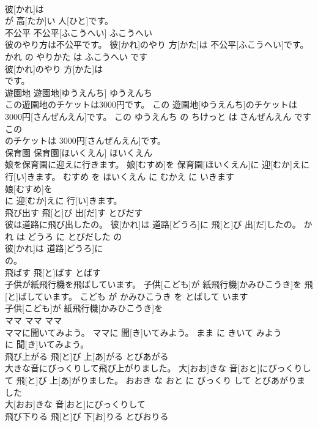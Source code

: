 \documentclass[8pt]{extreport}
\begin{document}
\begin{CJK}{UTF8}{min}
\\	彼[かれ]は
\\	が 高[たか]い 人[ひと]です。			
\\	不公平	不公平[ふこうへい]	ふこうへい	
\\	彼のやり方は不公平です。	彼[かれ]のやり 方[かた]は 不公平[ふこうへい]です。	かれ の やりかた は ふこうへい です	
\\	彼[かれ]のやり 方[かた]は
\\	です。			
\\	遊園地	遊園地[ゆうえんち]	ゆうえんち	
\\	この遊園地のチケットは3000円です。	この 遊園地[ゆうえんち]のチケットは 3000円[さんぜんえん]です。	この ゆうえんち の ちけっと は さんぜんえん です	
\\	この
\\	のチケットは 3000円[さんぜんえん]です。			
\\	保育園	保育園[ほいくえん]	ほいくえん	
\\	娘を保育園に迎えに行きます。	娘[むすめ]を 保育園[ほいくえん]に 迎[むか]えに 行[い]きます。	むすめ を ほいくえん に むかえ に いきます	
\\	娘[むすめ]を
\\	に 迎[むか]えに 行[い]きます。			
\\	飛び出す	飛[と]び 出[だ]す	とびだす	
\\	彼は道路に飛び出したの。	彼[かれ]は 道路[どうろ]に 飛[と]び 出[だ]したの。	かれ は どうろ に とびだした の	
\\	彼[かれ]は 道路[どうろ]に
\\	の。			
\\	飛ばす	飛[と]ばす	とばす	
\\	子供が紙飛行機を飛ばしています。	子供[こども]が 紙飛行機[かみひこうき]を 飛[と]ばしています。	こども が かみひこうき を とばして います	
\\	子供[こども]が 紙飛行機[かみひこうき]を
\\	ママ	ママ	ママ	
\\	ママに聞いてみよう。	ママに 聞[き]いてみよう。	まま に きいて みよう	
\\	に 聞[き]いてみよう。			
\\	飛び上がる	飛[と]び 上[あ]がる	とびあがる	
\\	大きな音にびっくりして飛び上がりました。	大[おお]きな 音[おと]にびっくりして 飛[と]び 上[あ]がりました。	おおき な おと に びっくり して とびあがりました	
\\	大[おお]きな 音[おと]にびっくりして
\\	飛び下りる	飛[と]び 下[お]りる	とびおりる	

\end{CJK}
\end{document}
